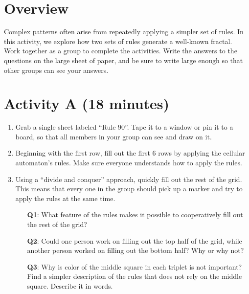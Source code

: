 \documentclass{article}
\begin{document}
\section*{Overview}

Complex patterns often arise from repeatedly applying a simpler set of rules.
In this activity, we explore how two sets of rules generate a well-known fractal.\\

\noindent Work together as a group to complete the activities. Write the
answers to the questions on the large sheet of paper, and be sure to write
large enough  so that other groups can see your answers.

\section*{Activity A (18 minutes)}

\begin{enumerate}
	\item Grab a single sheet labeled ``Rule 90''. Tape it to a window or pin
	it to a board, so that all members in your group can see and draw on it.

	\item Beginning with the first row, fill out the first $6$ rows by applying
	the cellular automaton's rules. Make sure everyone understands how to
	apply the rules.

	\item Using a ``divide and conquer'' approach, quickly fill out the rest
	of the grid. This means that every one in the group should pick up a marker
	and try to apply the rules at the same time.

		\begin{itemize}
		\item[\textbf{Q1}:] What feature of the rules makes it possible to cooperatively
		fill out the rest of the grid?

		\item[\textbf{Q2}:] Could one person work on filling out the top half of the grid,
		while another person worked on filling out the bottom half?
		Why or why not?

		\item[\textbf{Q3}:] Why is color of the middle square in each triplet
  is not important? Find a simpler description of the rules that does not rely on
  the middle square. Describe it in words.

		\end{itemize}

\end{enumerate}
\end{document}
